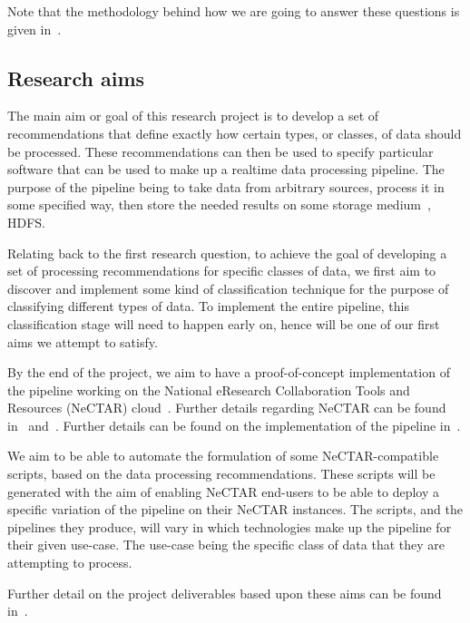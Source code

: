 \documentclass[a4paper,11pt]{article}
\begin{document}
Note that the methodology behind how we are going to answer these questions is given in~.



\subsection{Research aims} %
\label{sub:research_aims}

The main aim or goal of this research project is to develop a set of recommendations that define exactly how certain
types, or classes, of data should be processed. These recommendations can then be used to specify particular software
that can be used to make up a realtime data processing pipeline. The purpose of the pipeline being to take data from
arbitrary sources, process it in some specified way, then store the needed results on some storage medium~\eg{}, HDFS.

Relating back to the first research question, to achieve the goal of developing a set of processing recommendations for
specific classes of data, we first aim to discover and implement some kind of classification technique for the purpose of
classifying different types of data. To implement the entire pipeline, this classification stage will need to happen early
on, hence will be one of our first aims we attempt to satisfy.

By the end of the project, we aim to have a proof-of-concept implementation of the pipeline working on the National
eResearch Collaboration Tools and Resources (NeCTAR) cloud~\cite{web:Nectar}. Further details regarding NeCTAR can be
found in~ and~. Further details can be found on the
implementation of the pipeline in~.

We aim to be able to automate the formulation of some NeCTAR-compatible scripts, based on the data processing
recommendations. These scripts will be generated with the aim of enabling NeCTAR end-users to be able to deploy a
specific variation of the pipeline on their NeCTAR instances. The scripts, and the pipelines they produce, will vary in
which technologies make up the pipeline for their given use-case. The use-case being the specific class of data that
they are attempting to process.

Further detail on the project deliverables based upon these aims can be found in~.
\end{document}
